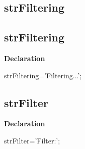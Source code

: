 \documentclass{report}
\newif\ifpdf
\begin{document}
\subsection*{\large{\textbf{strFiltering}}\normalsize\hspace{1ex}\hrulefill}
\else
\subsection*{strFiltering}
\fi
\label{trstrings-strFiltering}
\begin{list}{}{
\setlength{\itemindent}{0cm}
\setlength{\listparindent}{0cm}
\setlength{\leftmargin}{\evensidemargin}
\addtolength{\leftmargin}{\tmplength}
\settowidth{\labelsep}{X}
\addtolength{\leftmargin}{\labelsep}
\setlength{\labelwidth}{\tmplength}
}
\item[\textbf{Declaration}\hfill]
\ifpdf
\begin{flushleft}
\fi
\begin{ttfamily}
strFiltering='Filtering...';\end{ttfamily}

\ifpdf
\end{flushleft}
\fi

\end{list}
\ifpdf
\subsection*{\large{\textbf{strFilter}}\normalsize\hspace{1ex}\hrulefill}
\else
\subsection*{strFilter}
\fi
\label{trstrings-strFilter}
\begin{list}{}{
\setlength{\itemindent}{0cm}
\setlength{\listparindent}{0cm}
\setlength{\leftmargin}{\evensidemargin}
\addtolength{\leftmargin}{\tmplength}
\settowidth{\labelsep}{X}
\addtolength{\leftmargin}{\labelsep}
\setlength{\labelwidth}{\tmplength}
}
\item[\textbf{Declaration}\hfill]
\ifpdf
\begin{flushleft}
\fi
\begin{ttfamily}
strFilter='Filter:';\end{ttfamily}

\ifpdf
\end{flushleft}
\fi

\end{list}
\ifpdf
\end{document}
